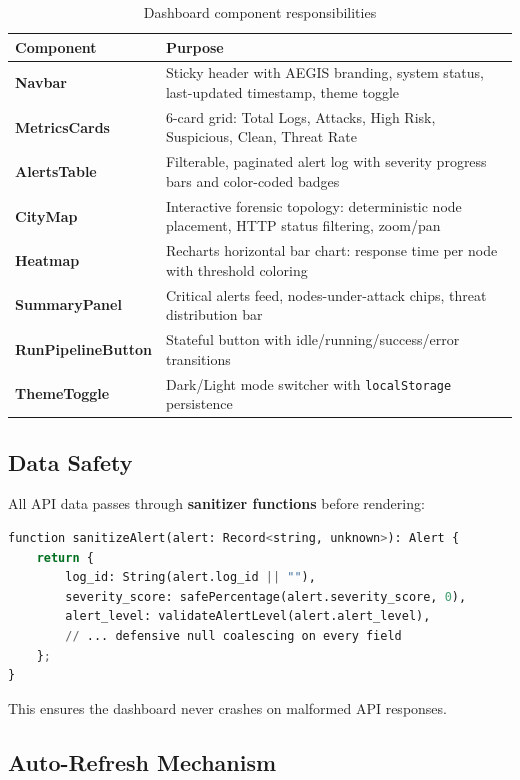 \documentclass[12pt,a4paper]{article}
\begin{document}
\begin{table}[H]
\centering
\begin{tabularx}{\linewidth}{>{\bfseries}l X}
\toprule
Component & Purpose \\
\midrule
Navbar & Sticky header with AEGIS branding, system status, last-updated timestamp, theme toggle \\
MetricsCards & 6-card grid: Total Logs, Attacks, High Risk, Suspicious, Clean, Threat Rate \\
AlertsTable & Filterable, paginated alert log with severity progress bars and color-coded badges \\
CityMap & Interactive forensic topology: deterministic node placement, HTTP status filtering, zoom/pan \\
Heatmap & Recharts horizontal bar chart: response time per node with threshold coloring \\
SummaryPanel & Critical alerts feed, nodes-under-attack chips, threat distribution bar \\
RunPipelineButton & Stateful button with idle/running/success/error transitions \\
ThemeToggle & Dark/Light mode switcher with \texttt{localStorage} persistence \\
\bottomrule
\end{tabularx}
\caption{Dashboard component responsibilities}
\end{table}

\subsection{Data Safety}

All API data passes through \textbf{sanitizer functions} before rendering:

\begin{lstlisting}[language=Python, caption={Frontend data sanitization (TypeScript)}]
function sanitizeAlert(alert: Record<string, unknown>): Alert {
    return {
        log_id: String(alert.log_id || ""),
        severity_score: safePercentage(alert.severity_score, 0),
        alert_level: validateAlertLevel(alert.alert_level),
        // ... defensive null coalescing on every field
    };
}
\end{lstlisting}

This ensures the dashboard never crashes on malformed API responses.

\subsection{Auto-Refresh Mechanism}
\end{document}
